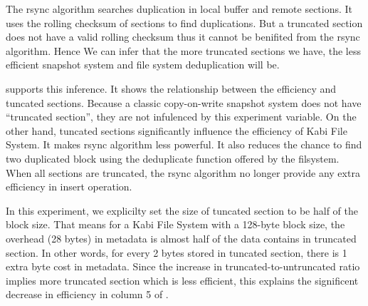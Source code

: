     The rsync algorithm searches duplication in local buffer and remote sections. It uses the rolling checksum of sections to find duplications. But a truncated section does not have a valid rolling checksum thus it cannot be benifited from the rsync algorithm. Hence We can infer that the more truncated sections we have, the less efficient snapshot system and file system deduplication will be.

     supports this inference. It shows the relationship between the efficiency and tuncated sections. Because a classic copy-on-write snapshot system does not have ``truncated section'', they are not infulenced by this experiment variable. On the other hand, tuncated sections significantly influence the efficiency of Kabi File System. It makes rsync algorithm less powerful. It also reduces the chance to find two duplicated block using the deduplicate function offered by the filsystem. When all sections are truncated, the rsync algorithm no longer provide any extra efficiency in insert operation.

    In this experiment, we explicilty set the size of tuncated section to be half of the block size. That means for a Kabi File System with a 128-byte block size, the overhead (28 bytes) in metadata is almost half of the data contains in truncated section. In other words, for every 2 bytes stored in tuncated section, there is 1 extra byte cost in metadata. Since the increase in truncated-to-untruncated ratio implies more truncated section which is less efficient, this explains the significent decrease in efficiency in column 5 of .

